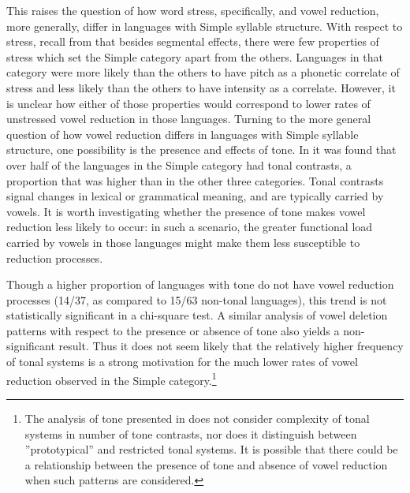   This raises the question of how word stress, specifically, and vowel reduction, more generally, differ in languages with Simple syllable structure. With respect to stress, recall from  that besides segmental effects, there were few properties of stress which set the Simple category apart from the others. Languages in that category were more likely than the others to have pitch as a phonetic correlate of stress and less likely than the others to have intensity as a correlate. However, it is unclear how either of those properties would correspond to lower rates of unstressed vowel reduction in those languages. Turning to the more general question of how vowel reduction differs in languages with Simple syllable structure, one possibility is the presence and effects of tone. In  it was found that over half of the languages in the Simple category had tonal contrasts, a proportion that was higher than in the other three categories. Tonal contrasts signal changes in lexical or grammatical meaning, and are typically carried by vowels. It is worth investigating whether the presence of tone makes vowel reduction less likely to occur: in such a scenario, the greater functional load carried by vowels in those languages might make them less susceptible to reduction processes.

  Though a higher proportion of languages with tone do not have vowel reduction processes (14/37, as compared to 15/63 non-tonal languages), this trend is not statistically significant in a chi-square test. A similar analysis of vowel deletion patterns with respect to the presence or absence of tone also yields a non-significant result. Thus it does not seem likely that the relatively higher frequency of tonal systems is a strong motivation for the much lower rates of vowel reduction observed in the Simple category.\footnote{{The analysis of tone presented in  does not consider complexity of tonal systems in number of tone contrasts,  nor does it distinguish between ”prototypical” and restricted tonal systems. It is possible that there could be a relationship between the presence of tone and absence of vowel reduction when such patterns are considered.}}

